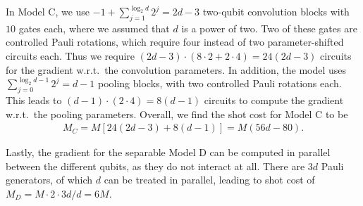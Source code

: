 \documentclass[twocolumn]{revtex4-2}
\begin{document}
In Model C, we use $-1+\sum_{j=1}^{\log_2 d} 2^j = 2d-3$ two-qubit convolution blocks with $10$ gates each, where we assumed that $d$ is a power of two. 
Two of these gates are controlled Pauli rotations, which require four instead of two parameter-shifted circuits each.
Thus we require $(2d-3) \cdot (8\cdot 2+2\cdot 4)=24(2d-3)$ circuits for the gradient w.r.t.\ the convolution parameters.
In addition, the model uses $\sum_{j=0}^{\log_2 d-1}2^j = d-1$ pooling blocks, with two controlled Pauli rotations each.
This leads to $(d-1)\cdot (2\cdot 4)=8(d-1)$ circuits to compute the gradient w.r.t.\ the pooling parameters.
Overall, we find the shot cost for Model C to be
\begin{align}
    M_C = M\left[24(2d-3)+8(d-1)\right]
    =M(56d-80).
\end{align}

Lastly, the gradient for the separable Model D can be computed in parallel between the different qubits, as they do not interact at all.
There are $3d$ Pauli generators, of which $d$ can be treated in parallel, leading to shot cost of $M_D=M\cdot 2\cdot 3d/d=6M$.
\end{document}

